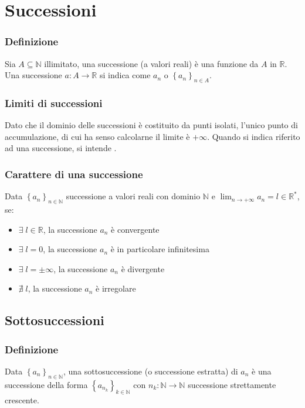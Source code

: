 \documentclass[a4paper]{article}
\begin{document}
\newpage


\section{Successioni}
\subsubsection*{Definizione}
Sia \(A \subseteq \mathbb{N}\) illimitato, una successione (a valori reali) è una funzione da \(A\) in \(\mathbb{R}\). \\
Una successione \(a : A \to \mathbb{R}\) si indica come \(a_n\) o \(\left\{ a_n \right\}_{n \in A}\).

\subsubsection*{Limiti di successioni}
Dato che il dominio delle successioni è costituito da punti isolati, l'unico punto di accumulazione, di cui ha senso calcolarne
il limite è \(+\infty\). Quando si indica  riferito ad una successione, si intende .

\subsubsection*{Carattere di una successione}
Data \(\left\{ a_n \right\}_{n \in \mathbb{N}}\) successione a valori reali con dominio \(\mathbb{N}\) e \(\displaystyle \lim_{n \to +\infty} a_n = l \in \mathbb{R}^*\), se:
\begin{itemize}
	\item \(\exists \; l \in \mathbb{R}\), la successione \(a_n\) è convergente
	\item \(\exists \; l = 0\), la successione \(a_n\) è in particolare infinitesima
	\item \(\exists \; l = \pm \infty\), la successione \(a_n\) è divergente
	\item \(\nexists \; l\), la successione \(a_n\) è irregolare
\end{itemize}

\subsection{Sottosuccessioni}
\subsubsection*{Definizione}
Data \(\left\{ a_n \right\}_{n \in \mathbb{N}}\), una sottosuccessione (o successione estratta) di \(a_n\) è una successione della forma \(\left\{ a_{n_k} \right\}_{k \in \mathbb{N}}\)
con \(n_k : \mathbb{N} \to \mathbb{N}\) successione strettamente crescente.
\end{document}

